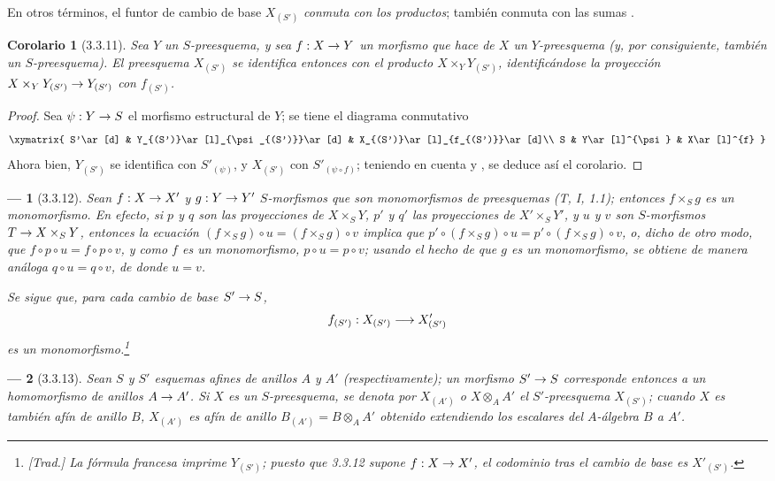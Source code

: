 \documentclass[oneside]{amsart}
\theoremstyle{ega-env-style}
\newtheorem*{env}{---}
\theoremstyle{ega-thm-env-style}
\newtheorem*{corollary}{Corolario}
\theoremstyle{ega-defn-env-style}
\renewcommand{\to}{\mathchoice{\longrightarrow}{\rightarrow}{\rightarrow}{\rightarrow}}
\newcommand{\oldpage}[2][]{{\marginnote{\normalfont{\textbf{#1}~|~#2}}}\ignorespaces}
\let\EGAOriginalLabel\label
\renewcommand{\label}[1]{\phantomsection\EGAOriginalLabel{#1}}
\begin{document}
En otros términos, el funtor de cambio de base $X_{(S')}$ \emph{conmuta con
los productos}; también conmuta con las sumas .

\begin{corollary}[3.3.11]
\label{I.3.3.11}
Sea $Y$ un $S$-preesquema, y sea $f:X\to Y$ un morfismo que hace de $X$ un
$Y$-preesquema (y, por consiguiente, también un $S$-preesquema). El preesquema $X_{(S')}$
se identifica entonces con el producto $X\times_Y Y_{(S')}$, identificándose la proyección
$X\times_Y Y_{(S')}\to Y_{(S')}$ con $f_{(S')}$. 
\end{corollary}

\begin{proof}
Sea $\psi:Y\to S$ el morfismo estructural de $Y$; se tiene el diagrama conmutativo
\label{I.3.3.11.diagram-fr}
\[
  \xymatrix{
    S'\ar[d] &
    Y_{(S')}\ar[l]_{\psi_{(S')}}\ar[d] &
    X_{(S')}\ar[l]_{f_{(S')}}\ar[d]\\
    S & Y\ar[l]^{\psi} & X\ar[l]^{f}
  }
\]
Ahora bien, $Y_{(S')}$ se identifica con $S'_{(\psi)}$, y $X_{(S')}$ con
$S'_{(\psi\circ f)}$; teniendo en cuenta  y
, se deduce así el corolario.
\end{proof}
\begin{env}[3.3.12]
\label{I.3.3.12}
Sean $f:X\to X'$ y $g:Y\to Y'$ $S$-morfismos que son \emph{monomorfismos}
de preesquemas (T, I, 1.1); entonces $f\times_S g$ es un \emph{monomorfismo}. En efecto,
si $p$ y $q$ son las proyecciones de $X\times_S Y$, $p'$ y $q'$ las proyecciones de
$X'\times_S Y'$, y $u$ y $v$ son $S$-morfismos $T\to X\times_S Y$, entonces la
ecuación $(f\times_S g)\circ u=(f\times_S g)\circ v$ implica que
$p'\circ(f\times_S g)\circ u=p'\circ(f\times_S g)\circ v$, o, dicho de otro modo, que
$f\circ p\circ u=f\circ p\circ v$, y como $f$ es un monomorfismo,
$p\circ u=p\circ v$; usando el hecho de que $g$ es un monomorfismo, se obtiene de manera análoga
$q\circ u=q\circ v$, de donde $u=v$.

\oldpage[I]{111}
Se sigue que, para cada cambio de base $S'\to S$,
\label{I.3.3.12.base-change-monomorphism-fr}
\[
  f_{(S')}:X_{(S')}\to X'_{(S')}
\]
es un monomorfismo.\footnote{\emph{[Trad.] La fórmula francesa imprime
$Y_{(S')}$; puesto que 3.3.12 supone $f:X\to X'$, el codominio tras el cambio de base es
$X'_{(S')}$.}}
\end{env}

\begin{env}[3.3.13]
\label{I.3.3.13}
Sean $S$ y $S'$ esquemas afines de anillos $A$ y $A'$ (respectivamente); un morfismo
$S'\to S$ corresponde entonces a un homomorfismo de anillos $A\to A'$. Si $X$ es un
$S$-preesquema, se denota por $X_{(A')}$ o $X\otimes_A A'$ el $S'$-preesquema
$X_{(S')}$; cuando $X$ es también afín de anillo $B$, $X_{(A')}$ es afín de anillo
$B_{(A')}=B\otimes_A A'$ obtenido extendiendo los escalares del $A$-álgebra
$B$ a $A'$.
\end{env}
\end{document}
